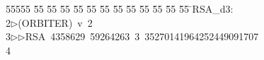 %
%
\begin{tabbing}
55555 \= 55 \= 55 \= 55 \= 55 \= 55 \= 55 \= 55 \= 55 \= 55 \= 55 \= 55 \= 55 \= \>RSA\_d3:\\[0pt]
2\>$\triangleright$\>(ORBITER)\ v\ 2\ \\[0pt]
3\>$\triangleright$\>$\triangleright$\>RSA\ 4358629\ 59264263\ 3\ 35270141964252449091707\\[0pt]
4\>\end{tabbing}
